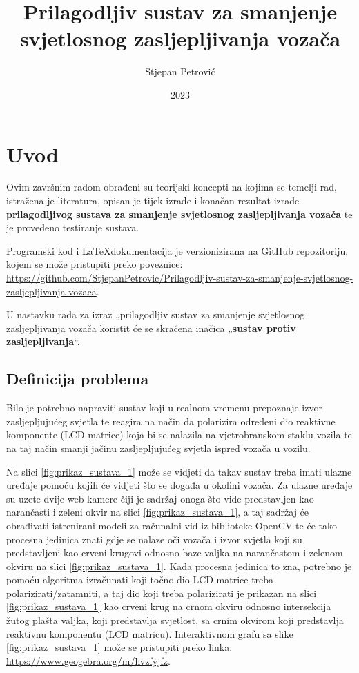\documentclass{foi}
\title{Prilagodljiv sustav za smanjenje svjetlosnog zasljepljivanja vozača}
\author{Stjepan Petrović}
\date{2023}
\begin{document}
\justifying



\maketitle

\tableofcontents

\pagestyle{plain}
\chapter{Uvod}

Ovim završnim radom obrađeni su teorijski koncepti na kojima se temelji rad, istražena je literatura, opisan je tijek izrade i konačan rezultat izrade \textbf{prilagodljivog sustava za smanjenje svjetlosnog zasljepljivanja vozača} te je provedeno testiranje sustava.

Programski kod i \LaTeX \space dokumentacija je verzionizirana na GitHub repozitoriju, kojem se može pristupiti preko poveznice: \href{https://github.com/StjepanPetrovic/Prilagodljiv-sustav-za-smanjenje-svjetlosnog-zasljepljivanja-vozaca}{https://github.com/StjepanPetrovic/Prilagodljiv-sustav-za-smanjenje-svjetlosnog-zasljepljivanja-vozaca}.

U nastavku rada za izraz „prilagodljiv sustav za smanjenje svjetlosnog zasljepljivanja vozača koristit će se skraćena inačica „\textbf{sustav protiv zasljepljivanja}“.

\section{Definicija problema}

 Bilo je potrebno napraviti sustav koji u realnom vremenu prepoznaje izvor zasljepljujućeg svjetla te reagira na način da polarizira određeni dio reaktivne komponente (LCD matrice) koja bi se nalazila na vjetrobranskom staklu vozila te na taj način smanji jačinu zasljepljujućeg svjetla ispred vozača u vozilu.

 Na slici \ref{fig:prikaz_sustava_1} može se vidjeti da takav sustav treba imati ulazne uređaje pomoću kojih će vidjeti što se događa u okolini vozača. Za ulazne uređaje su uzete dvije web kamere čiji je sadržaj onoga što vide predstavljen kao narančasti i zeleni okvir na slici \ref{fig:prikaz_sustava_1}, a taj sadržaj će obrađivati istrenirani modeli za računalni vid iz biblioteke OpenCV te će tako procesna jedinica znati gdje se nalaze oči vozača i izvor svjetla koji su predstavljeni kao crveni krugovi odnosno baze valjka na narančastom i zelenom okviru na slici \ref{fig:prikaz_sustava_1}. Kada procesna jedinica to zna, potrebno je pomoću algoritma izračunati koji točno dio LCD matrice treba polarizirati/zatamniti, a taj dio koji treba polarizirati je prikazan na slici \ref{fig:prikaz_sustava_1} kao crveni krug na crnom okviru odnosno intersekcija žutog plašta valjka, koji predstavlja svjetlost, sa crnim okvirom koji predstavlja reaktivnu komponentu (LCD matricu). Interaktivnom grafu sa slike \ref{fig:prikaz_sustava_1} može se pristupiti preko linka: \url{https://www.geogebra.org/m/hvzfyjfz}.
\end{document}
